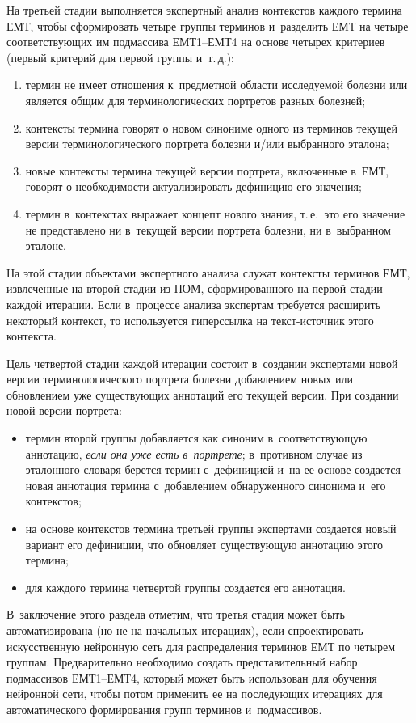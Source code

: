 \begin{multicols}{2}
  На третьей стадии выполняется экспертный анализ контекстов каждого 
термина ЕМТ, чтобы сформировать четыре группы терминов и~разделить 
ЕМТ на четыре соответствующих им подмассива ЕМТ1--ЕМТ4 на основе 
четырех критериев (первый критерий для первой группы и~т.\,д.):
  \begin{enumerate}[(1)]
\item термин не имеет отношения к~предметной области исследуемой болезни 
или является общим для терминологических портретов разных болезней;
\item контексты термина говорят о новом синониме одного из терминов 
текущей версии терминологического портрета болезни и/или выбранного 
эталона;
\item новые контексты термина текущей версии портрета, включенные 
в~ЕМТ, говорят о необходимости актуализировать дефиницию его значения;
\item термин в~контекстах выражает концепт нового знания, т.\,е.\ это его 
значение не представлено ни в~текущей версии портрета болезни, ни 
в~выбранном эталоне.
\end{enumerate}

  На этой стадии объектами экспертного анализа служат контексты 
терминов ЕМТ, извлеченные на второй стадии из ПОМ, сформированного на 
первой стадии каждой итерации. Если в~процессе анализа экспертам 
требуется расширить некоторый контекст, то используется гиперссылка на 
текст-ис\-точ\-ник этого контекста.
  
  Цель четвертой стадии каждой итерации состоит в~создании экспертами 
новой версии терминологического портрета болезни добавлением новых или 
обновлением уже существующих аннотаций его текущей версии. При 
создании новой версии портрета:
  \begin{itemize}
  \item термин второй группы добавляется как синоним в~соответствующую 
аннотацию, \textit{если она уже есть в~портрете}; в~противном случае из 
эталонного словаря берется термин с~дефиницией и~на ее основе создается 
новая аннотация термина с~добавлением обнаруженного синонима и~его 
контекстов;
  \item на основе контекстов термина третьей группы экспертами создается 
новый вариант его дефиниции, что обновляет существующую аннотацию 
этого термина;
  \item для каждого термина четвертой группы создается его аннотация.
  \end{itemize}
  
  В~заключение этого раздела отметим, что \mbox{третья} стадия может быть 
автоматизирована (но не на начальных итерациях), если спроектировать 
искусственную нейронную сеть для распределения терминов ЕМТ по 
четырем группам. Предварительно необходимо создать представительный 
набор подмассивов ЕМТ1--ЕМТ4, который может быть использован для 
обучения нейронной сети, чтобы потом применить ее на последующих 
итерациях для автоматического формирования групп терминов 
и~подмассивов.
  

\end{multicols}
